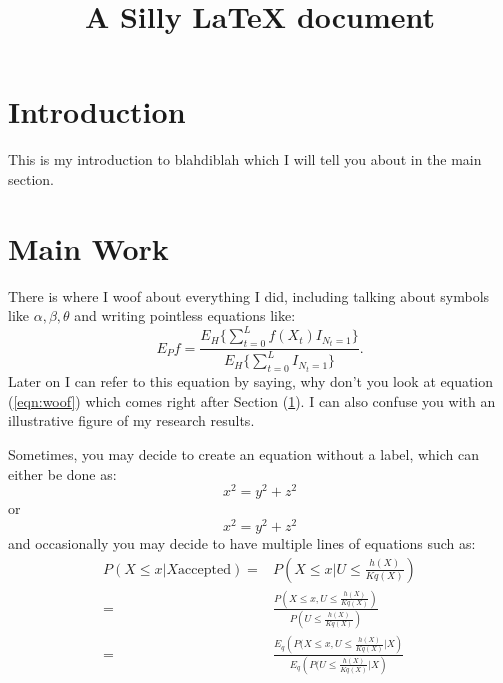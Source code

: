 \documentclass[12pt]{article}
\begin{document}
\title{A Silly LaTeX document}
\maketitle
\section{Introduction}\label{sec:intro}
This is my introduction to blahdiblah which I will tell you about in the main section.

\section{Main Work}\label{sec:main}
There is where I woof about everything I did, including talking about symbols like $\alpha,\beta, \theta$ and writing pointless equations like: 
\begin{equation}\label{eqn:woof} 
E_P f = \frac{E_H\{\sum_{t=0}^Lf(X_t)
  I_{N_t=1}\}} {E_H\{\sum_{t=0}^L I_{N_t=1}\}}.  
\end{equation} 
Later on I can refer to this equation by saying, why don't you look at
equation (\ref{eqn:woof}) which comes right after Section
(\ref{sec:intro}). I can also confuse you with an illustrative figure
of my research results.

Sometimes, you may decide to create an equation without a label, which can either be done as: 
$$ x^2 = y^2 + z^2$$ or 
\begin{equation*} 
  x^2 = y^2 + z^2 
\end{equation*} and occasionally you may decide to have multiple lines of equations such as: 
\begin{equation}
  \begin{split}
    P(X \leq x | X \mbox{accepted}) = & P\left(X \leq x | U \leq \frac{h(X)}{K q(X)}\right)\\
  = & \frac{P\left(X \leq x, U \leq \frac{h(X)}{K q(X)}\right)}{P(U \leq \frac{h(X)}{K q(X)})}\\
  = & \frac{E_q\left(P(X \leq x, U \leq \frac{h(X)}{K q(X)}| X\right)}{E_q\left(P(U \leq \frac{h(X)}{K q(X)} | X\right)}
  \end{split}
\end{equation}
\end{document}
